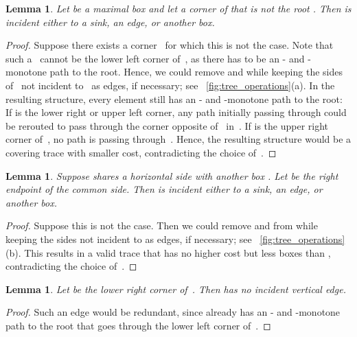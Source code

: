 \documentclass[a4paper,11pt]{article}
\newtheorem{lemma}[theorem]{Lemma}
\newcommand{\qedopt}{}
\begin{document}
\begin{lemma}\label{lem:no_dangling_corner}
Let  be a maximal box and let  a corner of  that is not the root .
Then  is incident either to a sink, an edge, or another box.
\end{lemma}
\begin{proof}
Suppose there exists a corner~ for which this is not the case.
Note that such a~ cannot be the lower left corner of~, as there has to be an - and -monotone path to the root.
Hence, we could remove  and  while keeping the sides of~ not incident to~ as edges, if necessary;
see \figurename~\ref{fig:tree_operations}(a).
In the resulting structure, every element still has an - and -monotone path to the root:
If  is the lower right or upper left corner, any path initially passing through  could be rerouted to pass through the corner opposite of~ in~.
If  is the upper right corner of~, no path is passing through~.
Hence, the resulting structure would be a covering trace with smaller cost, contradicting the choice of~.
\qedopt
\end{proof}

\begin{lemma}\label{lem:no_double_box}
Suppose  shares a horizontal side with another box .
Let  be the right endpoint of the common side.
Then  is incident either to a sink, an edge, or another box.
\end{lemma}
\begin{proof}
Suppose this is not the case.
Then we could remove  and  from  while keeping the sides not incident to  as edges, if necessary; see \figurename~\ref{fig:tree_operations}(b).
This results in a valid trace that has no higher cost but less boxes than , contradicting the choice of~.
\qedopt
\end{proof}

\begin{lemma}\label{lem:no_vertical_edge}
Let  be the lower right corner of~.
Then  has no incident vertical edge.
\end{lemma}
\begin{proof}
Such an edge would be redundant, since  already has an - and -monotone path to the root that goes through the lower left corner of~.
\qedopt
\end{proof}
\end{document}
